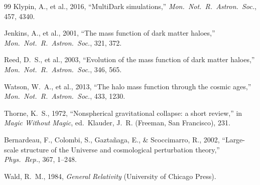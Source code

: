 \documentclass[11pt]{article}
\begin{document}
\begin{thebibliography}{99}
Klypin, A., et al., 2016, ``MultiDark simulations,''
\textit{Mon.\ Not.\ R.\ Astron.\ Soc.}, 457, 4340.

Jenkins, A., et al., 2001, ``The mass function of dark matter haloes,''
\textit{Mon.\ Not.\ R.\ Astron.\ Soc.}, 321, 372.

Reed, D.~S., et al., 2003, ``Evolution of the mass function of dark matter
haloes,'' \textit{Mon.\ Not.\ R.\ Astron.\ Soc.}, 346, 565.

Watson, W.~A., et al., 2013, ``The halo mass function through the cosmic
ages,'' \textit{Mon.\ Not.\ R.\ Astron.\ Soc.}, 433, 1230.

Thorne, K.~S., 1972, ``Nonspherical gravitational collapse: a short
review,'' in \textit{Magic Without Magic}, ed.\ Klauder, J.~R.
(Freeman, San Francisco), 231.

Bernardeau, F., Colombi, S., Gazta\~{n}aga, E., \& Scoccimarro, R.,
2002, ``Large-scale structure of the Universe and cosmological
perturbation theory,'' \textit{Phys.\ Rep.}, 367, 1--248.

Wald, R.~M., 1984, \textit{General Relativity} (University of Chicago Press).

\end{thebibliography}
\end{document}
